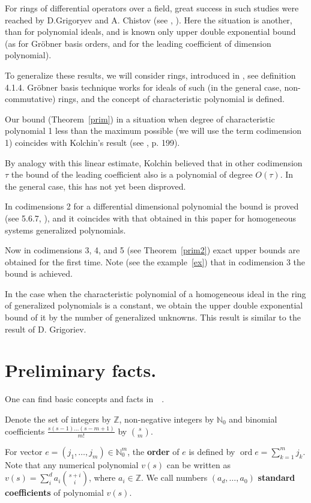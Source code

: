 \documentclass[a4paper,reqno,12pt]{amsart}
\theoremstyle{plain}
\theoremstyle{remark}
\theoremstyle{definition}
\DeclareMathOperator {\ord}{ord}
\newcommand{\N}{\mathbb{N}}
\newcommand{\Z}{\mathbb{Z}}
\def\ord{\operatorname{ord}}
\begin{document}
For rings of differential operators over a field, great success
in such studies  were  reached by D.Grigoryev and A. Chistov 
(see \cite {Grig}, \cite {Janet}).
Here the situation is another, 
than for polynomial ideals, and is known only
upper double exponential bound (as for 
Gr\"obner basis orders, and for the leading coefficient of dimension
polynomial).
 
To generalize these results, we will consider  rings,
introduced in
\cite {KLMP}, see definition 4.1.4.
Gr\"obner basis technique works for ideals of such 
(in the general case, non-commutative)
rings, and the concept of
characteristic
polynomial  is defined.
 
Our bound (Theorem~\ref{prim})
in  a situation when  degree of  characteristic polynomial
1 less than the maximum possible
(we will use the term codimension 1)
coincides with Kolchin’s result (see \cite{Kolchin}, p. 199).

By analogy with this linear estimate, Kolchin believed that in
other codimension $\tau$ the bound of the leading coefficient
also is
 a polynomial of degree $O(\tau)$.
In the general case, this has not yet been disproved.

In codimensions 2 for a differential dimensional polynomial
the bound is proved (see 5.6.7, \cite {KLMP}),   and it
coincides with that obtained in this paper for homogeneous systems
generalized polynomials.

Now in codimensions 3, 4, and 5 (see Theorem~\ref{prim2})
exact upper bounds are obtained for the first time.
Note (see the example~\ref{ex}) that in codimension 3
the bound  is achieved.

In the case when the characteristic polynomial of a homogeneous ideal
in the ring of generalized polynomials is a constant, we
obtain the upper
double exponential bound  of it
 by the number of generalized unknowns. This result is 
similar to the result of D. Grigoriev. 


\section{Preliminary facts.}

One can find 
basic concepts and facts  in~~\cite{Kolchin,Ritt,KLMP}. 

Denote   the set  of integers by $\Z$, 
non-negative integers by $\N_0$  and   binomial coefficients 
$\frac{s(s-1)\dots(s-m+1)}{m!}$ by $\binom{s}{m}$.

For vector $e=(j_1,\dots, j_m) \in\N_0^m$, the {\bf order} of  $e$ 
is defined by 
$\ord e=\sum_{k=1}^mj_k$. 
Note that any numerical 
polynomial $v(s)$ can be written as $v(s) =\sum_i^da_i\binom{s+i}{i}$,
where $a_i\in\Z$. We call numbers $(a_d,\dots, a_0)$ {\bf
standard coefficients } of polynomial $v(s)$.
\end{document}
